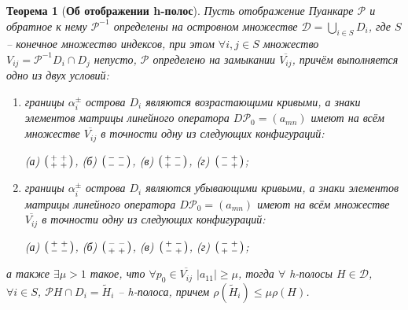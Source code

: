 \documentclass{article}
\newtheorem*{theorem}{Теорема}
\newenvironment{psm}
	{\left( \begin{smallmatrix}}
	{\end{smallmatrix} \right) }
\begin{document}
\begin{theorem}[{\bf Об отображении h-полос}]

Пусть отображение Пуанкаре $\mathcal{P}$ и обратное к нему $\mathcal{P}^{-1}$ определены на островном множестве $\mathcal{D} = \bigcup_{i \in S} D_i$, где $S$ -- конечное множество индексов, при этом $\forall i, j \in S$ множество $V_{ij} = \mathcal{P}^{-1} D_i \cap D_j$ непусто, $\mathcal{P}$ определено на замыкании $\overline{V_{ij}}$, причём выполняется одно из двух условий:
\begin{enumerate}
	\item границы $\alpha_i^{\pm}$ острова $D_i$ являются возрастающими кривыми, а знаки элементов матрицы линейного оператора $D \mathcal{P}_0 = (a_{mn})$ имеют на всём множестве $\overline{V_{ij}}$ в точности одну из следующих конфигураций:
		\begin{center}
			(а) $\begin{psm} + & + \\ + & + \end{psm}$, \quad
			(б) $\begin{psm} - & - \\ - & - \end{psm}$, \quad
			(в) $\begin{psm} + & - \\ + & - \end{psm}$, \quad
			(г) $\begin{psm} - & + \\ - & + \end{psm}$;
		\end{center}
	\item границы $\alpha_i^{\pm}$ острова $D_i$ являются убывающими кривыми, а знаки элементов матрицы линейного оператора $D \mathcal{P}_0 = (a_{mn})$ имеют на всём множестве $\overline{V_{ij}}$ в точности одну из следующих конфигураций:
		\begin{center}
			(а) $\begin{psm} + & + \\ - & - \end{psm}$, \quad
			(б) $\begin{psm} - & - \\ + & + \end{psm}$,	\quad
			(в) $\begin{psm} + & - \\ - & + \end{psm}$, \quad
			(г) $\begin{psm} - & + \\ + & - \end{psm}$;		
		\end{center}
	\end{enumerate}
а также $\exists \mu > 1$ такое, что $\forall p_0 \in \overline{V_{ij}}$ $|a_{11}| \ge \mu$, тогда $\forall$ h-полосы $H \in \mathcal{D}$, $\forall i \in S$, $\mathcal{P} H \cap D_i = \widetilde{H}_i$ -- h-полоса, причем $\rho(\widetilde{H}_i) \le \mu \rho(H)$.

\end{theorem}
\end{document}
